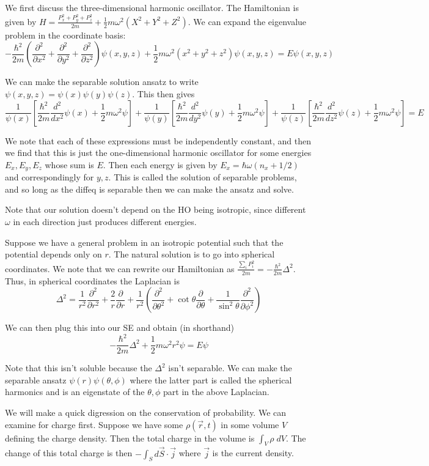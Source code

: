 \documentclass[10pt]{report}
\newcommand{\pd}[2]{\frac{\partial #1}{\partial#2}}
\newcommand{\rtd}[2]{\frac{d^2#1}{d#2^2}}
\newcommand{\ptd}[2]{\frac{\partial^2 #1}{\partial#2^2}}
\begin{document}
We first discuss the three-dimensional harmonic oscillator. The Hamiltonian is given by $H = \frac{P_x^2 + P_y^2+P_z^2}{2m} + \frac{1}{2}m\omega^2\left( X^2+Y^2+Z^2 \right)$. We can expand the eigenvalue problem in the coordinate basis:
$$-\frac{\hbar^2}{2m} \left(\ptd{}{x} + \ptd{}{y} + \ptd{}{z}\right)\psi(x,y,z) + \frac{1}{2}m\omega^2\left( x^2+y^2+z^2 \right)\psi(x,y,z) = E\psi(x,y,z)$$

We can make the separable solution ansatz to write $\psi(x,y,z)=\psi(x)\psi(y)\psi(z)$. This then gives
$$\frac{1}{\psi(x)}\left[ \frac{\hbar^2}{2m}\rtd{}{x}\psi(x) + \frac{1}{2}m\omega^2 \psi\right] + \frac{1}{\psi(y)}\left[ \frac{\hbar^2}{2m}\rtd{}{y}\psi(y) + \frac{1}{2}m\omega^2 \psi\right] + \frac{1}{\psi(z)}\left[ \frac{\hbar^2}{2m}\rtd{}{z}\psi(z) + \frac{1}{2}m\omega^2 \psi\right] = E$$

We note that each of these expressions must be independently constant, and then we find that this is just the one-dimensional harmonic oscillator for some energies $E_x,E_y, E_z$ whose sum is $E$. Then each energy is given by $E_x = \hbar\omega\left( n_x + 1/2 \right)$ and correspondingly for $y,z$. This is called the solution of separable problems, and so long as the diffeq is separable then we can make the ansatz and solve. 

Note that our solution doesn't depend on the HO being isotropic, since different $\omega$ in each direction just produces different energies.

Suppose we have a general problem in an isotropic potential such that the potential depends only on $r$. The natural solution is to go into spherical coordinates. We note that we can rewrite our Hamiltonian as $\frac{\sum_i P_i^2}{2m} = -\frac{\hbar^2}{2m}\Delta^2$. Thus, in spherical coordinates the Laplacian is
$$\Delta^2 = \frac{1}{r^2}\ptd{}{r} + \frac{2}{r}\pd{}{r} + \frac{1}{r^2}\left( \ptd{}{\theta} + \cot \theta \pd{}{\theta} + \frac{1}{\sin^2\theta}\ptd{}{\phi} \right)$$

We can then plug this into our SE and obtain (in shorthand)
$$-\frac{\hbar^2}{2m}\Delta^2 + \frac{1}{2}m\omega^2 r^2 \psi = E\psi$$

Note that this isn't soluble because the $\Delta^2$ isn't separable. We can make the separable ansatz $\psi(r)\psi(\theta,\phi)$ where the latter part is called the spherical harmonics and is an eigenstate of the $\theta,\phi$ part in the above Laplacian. 

We will make a quick digression on the conservation of probability. We can examine for charge first. Suppose we have some $\rho(\vec{r},t)$ in some volume $V$ defining the charge density. Then the total charge in the volume is $\int_V \rho \; dV$. The change of this total charge is then $-\int_S d\vec{S}\cdot \vec{j}$ where $\vec{j}$ is the current density.
\end{document}

